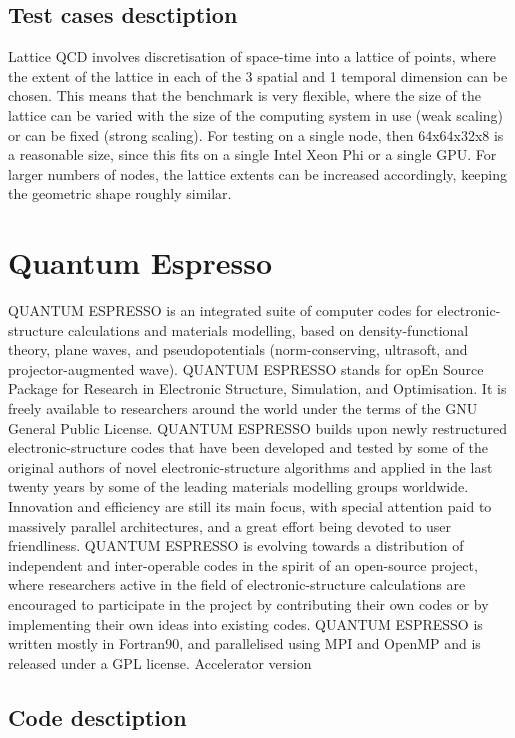 \subsection{Test cases desctiption}
Lattice QCD involves discretisation of space-time into a lattice of points, where the extent of the lattice in each of the 3 spatial and 1 temporal dimension can be chosen. This means that the benchmark is very flexible, where the size of the lattice can be varied with the size of the computing system in use (weak scaling) or can be fixed (strong scaling). For testing on a single node, then 64x64x32x8 is a reasonable size, since this fits on a single Intel Xeon Phi or a single GPU. For larger numbers of nodes, the lattice extents can be increased accordingly, keeping the geometric shape roughly similar.


\section{Quantum Espresso}

QUANTUM ESPRESSO is an integrated suite of computer codes for electronic-structure calculations and materials modelling, based on density-functional theory, plane waves, and pseudopotentials (norm-conserving, ultrasoft, and projector-augmented wave). QUANTUM ESPRESSO stands for opEn Source Package for Research in Electronic Structure, Simulation, and Optimisation. It is freely available to researchers around the world under the terms of the GNU General Public License. QUANTUM ESPRESSO builds upon newly restructured electronic-structure codes that have been developed and tested by some of the original authors of novel electronic-structure algorithms and applied in the last twenty years by some of the leading materials modelling groups worldwide. Innovation and efficiency are still its main focus, with special attention paid to massively parallel architectures, and a great effort being devoted to user friendliness. QUANTUM ESPRESSO is evolving towards a distribution of independent and inter-operable codes in the spirit of an open-source project, where researchers active in the field of electronic-structure calculations are encouraged to participate in the project by contributing their own codes or by implementing their own ideas into existing codes.
QUANTUM ESPRESSO is written mostly in Fortran90, and parallelised using MPI and OpenMP and is released under a GPL license.
Accelerator version

\subsection{Code desctiption}

